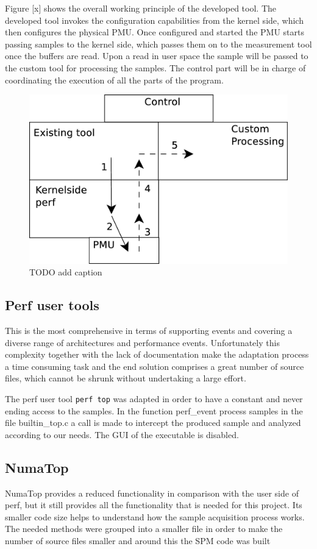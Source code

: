 Figure [x] shows the overall working principle of the developed tool. The developed tool invokes the configuration capabilities from the kernel side, which then configures the physical PMU. Once configured and started the PMU starts passing samples to the kernel side, which passes them on to the measurement tool once the buffers are read. Upon a read in user space the sample will be passed to the custom tool for processing the samples. The control part will be in charge of coordinating the execution of all the parts of the program.

\begin{figure}
	\centering
		\includegraphics[width=.8\textwidth]{figures/dev-strategy.eps}
		\caption[basic-uma]{TODO add caption}
		\label{fig:dstrategy}
\end{figure}
\subsection{Perf user tools}\label{section:perf-ut}

This is the most comprehensive in terms of supporting events and covering a diverse range of architectures and performance events. Unfortunately this complexity together with the lack of documentation make the adaptation process a time consuming task and the end solution comprises a great number of source files, which cannot be shrunk without undertaking a large effort. 

The perf user tool \texttt{perf top} was adapted in order to have a constant and never ending access to the samples. In the function perf\_event process samples in the file builtin\_top.c a call is made to intercept the produced sample and analyzed according to our needs. The GUI of the executable is disabled.

\subsection{NumaTop}\label{section:numatop}
NumaTop provides a reduced functionality in comparison with the user side of perf, but it still provides all the functionality that is needed for this project. Its smaller code size helps to understand how the sample acquisition process works. The needed methods were grouped into a smaller file in order to make the number of source files smaller and around this the SPM code was built


